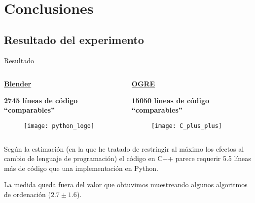 \section{Conclusiones} 

\subsection{Resultado del experimento}
\begin{frame}{Resultado}
\begin{columns}
  \begin{column}{0.5\textwidth}
    \textbf{\underline{Blender}}
    
    \textbf{2745 líneas de código ``comparables''}

	\begin{figure}
		\texttt{[image: python\_logo]} 
	\end{figure}
  \end{column}

  \begin{column}{0.5\textwidth}
    \textbf{\underline{OGRE}}
    
    \textbf{15050 líneas de código ``comparables''}

	\begin{figure}
		\texttt{[image: C\_plus\_plus]} 
	\end{figure}
  \end{column}
\end{columns}

\vspace{0.5cm}
Según la estimación (en la que he tratado de restringir al máximo los
efectos al cambio de lenguaje de programación) el código en C++ parece
requerir 5.5 líneas más de código que una implementación en Python.

\vspace{0.5cm}
La medida queda fuera del valor que obtuvimos muestreando
algunos algoritmos de ordenación ($2.7 \pm 1.6$).

\end{frame}

